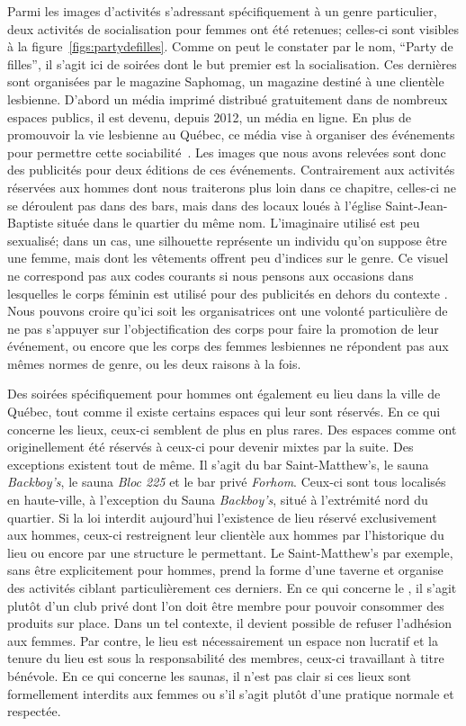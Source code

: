 Parmi les images d'activités s'adressant spécifiquement à un genre particulier, deux activités de socialisation pour femmes ont été retenues; celles-ci sont visibles à la figure~\ref{figs:partydefilles}.
Comme on peut le constater par le nom, \enquote{Party de filles}, il s'agit ici de soirées dont le but premier est la socialisation.
Ces dernières sont organisées par le magazine Saphomag, un magazine destiné à une clientèle lesbienne.
D'abord un média imprimé distribué gratuitement dans de nombreux espaces publics, il est devenu, depuis 2012, un média en ligne.
En plus de promouvoir la vie lesbienne au Québec, ce média vise à organiser des événements pour permettre cette sociabilité~\citep{Saphomag2016}.
Les images que nous avons relevées sont donc des publicités pour deux éditions de ces événements.
Contrairement aux activités réservées aux hommes dont nous traiterons plus loin dans ce chapitre, celles-ci ne se déroulent pas dans des bars, mais dans des locaux loués à l'église Saint-Jean-Baptiste située dans le quartier du même nom.
L'imaginaire utilisé est peu sexualisé; dans un cas, une silhouette représente un individu qu'on suppose être une femme, mais dont les vêtements offrent peu d'indices sur le genre.
Ce visuel ne correspond pas aux codes courants si nous pensons aux occasions dans lesquelles le corps féminin est utilisé pour des publicités en dehors du contexte \lgbt{}.
Nous pouvons croire qu'ici soit les organisatrices ont une volonté particulière de ne pas s'appuyer sur l'objectification des corps pour faire la promotion de leur événement, ou encore que les corps des femmes lesbiennes ne répondent pas aux mêmes normes de genre, ou les deux raisons à la fois.

Des soirées spécifiquement pour hommes ont également eu lieu dans la ville de Québec, tout comme il existe certains espaces qui leur sont réservés.
En ce qui concerne les lieux, ceux-ci semblent de plus en plus rares.
Des espaces comme  ont originellement été réservés à ceux-ci pour devenir mixtes par la suite.
Des exceptions existent tout de même.
Il s'agit du bar Saint-Matthew's, le sauna \emph{Backboy's}, le sauna \emph{Bloc 225} et le bar privé \emph{Forhom}.
Ceux-ci sont tous localisés en haute-ville, à l'exception du Sauna \emph{Backboy's}, situé à l'extrémité nord du quartier.
Si la loi interdit aujourd'hui l'existence de lieu réservé exclusivement aux hommes, ceux-ci restreignent leur clientèle aux hommes par l'historique du lieu ou encore par une structure le permettant.
Le Saint-Matthew's par exemple, sans être explicitement pour hommes, prend la forme d'une taverne et organise des activités ciblant particulièrement ces derniers.
En ce qui concerne le , il s'agit plutôt d'un club privé dont l'on doit être membre pour pouvoir consommer des produits sur place.
Dans un tel contexte, il devient possible de refuser l'adhésion aux femmes.
Par contre, le lieu est nécessairement un espace non lucratif et la tenure du lieu est sous la responsabilité des membres, ceux-ci travaillant à titre bénévole.
En ce qui concerne les saunas, il n'est pas clair si ces lieux sont formellement interdits aux femmes ou s'il s'agit plutôt d'une pratique normale et respectée.

